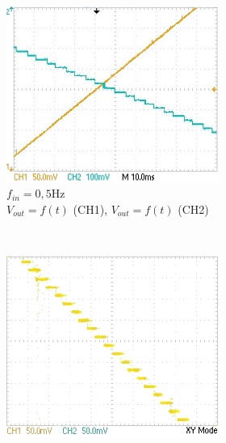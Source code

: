\documentclass{article}
\begin{document}
\begin{figure}
	\centering
	\begin{subfigure}[b]{0.3\textwidth}
		\begin{subfigure}[b]{\textwidth}
			\centering
			\includegraphics[width=\textwidth]{data/TEK0018_}
			\caption{\centering $f_{in}=\mathrm{0,5 Hz}$\\$V_{out}=f(t)$ (CH1), $V_{out}=f(t)$ (CH2)}
			\label{fig:slowT}
		\end{subfigure}
		\\
		\begin{subfigure}[b]{\textwidth}
			\centering
			\includegraphics[width=\textwidth]{data/TEK0017_}

\end{subfigure}
\end{subfigure}
\end{figure}
\end{document}
